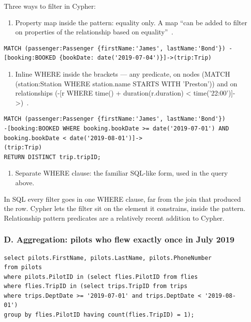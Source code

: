 \documentclass[11pt,a4paper]{article}
\begin{document}
Three ways to filter in Cypher:

\begin{enumerate}
  \item Property map inside the pattern: equality only. A map ``can be added to filter on properties of the relationship based on equality''~\cite{neo4j2026patterns}.
\end{enumerate}

\begin{lstlisting}[style=cyphercode,caption={Filtering with a property map inside the pattern},label={lst:q2map}]
MATCH (passenger:Passenger {firstName:'James', lastName:'Bond'}) - [booking:BOOKED {bookDate: date('2019-07-04')}]->(trip:Trip)
\end{lstlisting}

\begin{enumerate}[resume]
  \item Inline WHERE inside the brackets --- any predicate, on nodes (MATCH (station:Station WHERE station.name STARTS WITH 'Preston')) and on relationships (-[r WHERE time() + duration(r.duration) < time('22:00')]->)~\cite{neo4j2026patterns}.
\end{enumerate}

\begin{lstlisting}[style=cyphercode,caption={Filtering with an inline WHERE inside the relationship brackets},label={lst:q2inline}]
MATCH (passenger:Passenger {firstName:'James', lastName:'Bond'})
-[booking:BOOKED WHERE booking.bookDate >= date('2019-07-01') AND booking.bookDate < date('2019-08-01')]->
(trip:Trip)
RETURN DISTINCT trip.tripID;
\end{lstlisting}

\begin{enumerate}[resume]
  \item Separate WHERE clause: the familiar SQL-like form, used in the query above.
\end{enumerate}

In SQL every filter goes in one WHERE clause, far from the join that produced the row. Cypher lets the filter sit on the element it constrains, inside the pattern. Relationship pattern predicates are a relatively recent addition to Cypher.

\subsubsection*{D. Aggregation: pilots who flew exactly once in July 2019}

\begin{lstlisting}[style=sqlcode,caption={Pilots who flew exactly once in July 2019, in SQL},label={lst:q3sql}]
select pilots.FirstName, pilots.LastName, pilots.PhoneNumber
from pilots
where pilots.PilotID in (select flies.PilotID from flies
where flies.TripID in (select trips.TripID from trips
where trips.DeptDate >= '2019-07-01' and trips.DeptDate < '2019-08-01')
group by flies.PilotID having count(flies.TripID) = 1);
\end{lstlisting}
\end{document}
